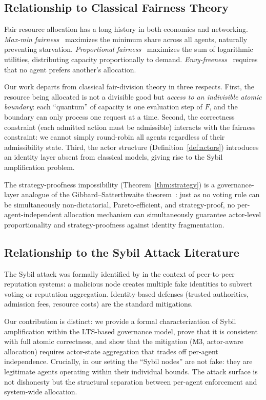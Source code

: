 \documentclass[11pt]{article}
\theoremstyle{plain}
\theoremstyle{definition}
\theoremstyle{remark}
\begin{document}
\subsection{Relationship to Classical Fairness Theory}
\label{sec:related-fair}

Fair resource allocation has a long history in both economics and
networking.  \emph{Max-min fairness}~\citep{demers89, bertsekas87}
maximizes the minimum share across all agents, naturally preventing
starvation.  \emph{Proportional fairness}~\citep{kelly98} maximizes
the sum of logarithmic utilities, distributing capacity proportionally
to demand.  \emph{Envy-freeness}~\citep{foley67, varian74} requires
that no agent prefers another's allocation.

Our work departs from classical fair-division theory in three respects.
First, the resource being allocated is not a divisible good but
\emph{access to an indivisible atomic boundary}: each ``quantum'' of
capacity is one evaluation step of $F$, and the boundary can only
process one request at a time.  Second, the correctness constraint
(each admitted action must be admissible) interacts with the fairness
constraint: we cannot simply round-robin all agents regardless of
their admissibility state.  Third, the actor structure
(Definition~\ref{def:actors}) introduces an identity layer absent
from classical models, giving rise to the Sybil amplification problem.

The strategy-proofness impossibility (Theorem~\ref{thm:strategy}) is a
governance-layer analogue of the Gibbard--Satterthwaite
theorem~\citep{gibbard73, satterthwaite75}: just as no voting rule can
be simultaneously non-dictatorial, Pareto-efficient, and
strategy-proof, no per-agent-independent allocation mechanism can
simultaneously guarantee actor-level proportionality and
strategy-proofness against identity fragmentation.

\subsection{Relationship to the Sybil Attack Literature}
\label{sec:related-sybil}

The Sybil attack was formally identified by \citet{douceur02} in the
context of peer-to-peer reputation systems: a malicious node creates
multiple fake identities to subvert voting or reputation aggregation.
Identity-based defenses (trusted authorities, admission fees, resource
costs) are the standard mitigations.

Our contribution is distinct: we provide a formal characterization of
Sybil amplification within the LTS-based governance model, prove that
it is consistent with full atomic correctness, and show that the
mitigation (M3, actor-aware allocation) requires actor-state
aggregation that trades off per-agent independence.  Crucially, in our
setting the ``Sybil nodes'' are not fake: they are legitimate agents
operating within their individual bounds.  The attack surface is not
dishonesty but the structural separation between per-agent enforcement
and system-wide allocation.
\end{document}
